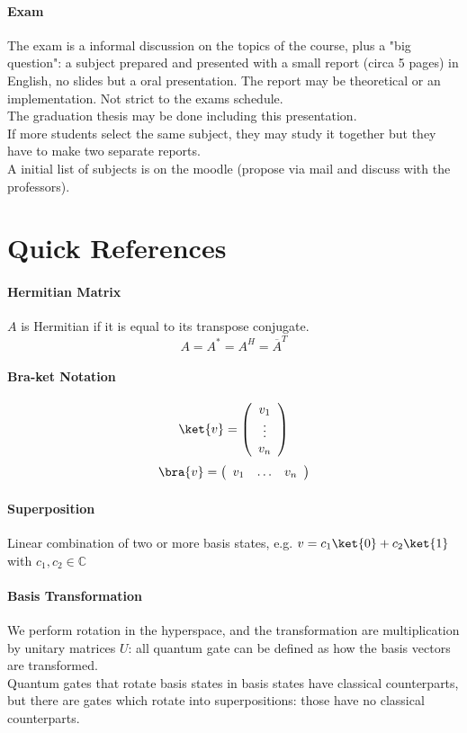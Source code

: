\documentclass[10pt]{report}
\begin{document}
\paragraph{Exam} The exam is a informal discussion on the topics of the course, plus a "big question": a subject prepared and presented with a small report (circa 5 pages) in English, no slides but a oral presentation. The report may be theoretical or an implementation. Not strict to the exams schedule.\\
The graduation thesis may be done including this presentation.\\
If more students select the same subject, they may study it together but they have to make two separate reports.\\
A initial list of subjects is on the moodle (propose via mail and discuss with the professors).
\section{Quick References}
\paragraph{Hermitian Matrix} $A$ is Hermitian if it is equal to its transpose conjugate.
$$A = A^* = A^H = \overline{A}^T$$
\paragraph{Bra-ket Notation} $$\ket{v} = \left(\begin{array}{c}
v_1\\\vdots\\v_n
\end{array}\right)$$
$$\bra{v} = \left(\begin{array}{c c c}
v_1&\ldots&v_n
\end{array}\right)$$
\paragraph{Superposition} Linear combination of two or more basis states, e.g. $v = c_1\ket{0}+c_2\ket{1}$ with $c_1,c_2\in\mathbb{C}$
\paragraph{Basis Transformation} We perform rotation in the hyperspace, and the transformation are multiplication by unitary matrices $U$: all quantum gate can be defined as how the basis vectors are transformed.\\
Quantum gates that rotate basis states in basis states have classical counterparts, but there are gates which rotate into superpositions: those have no classical counterparts.
\end{document}
